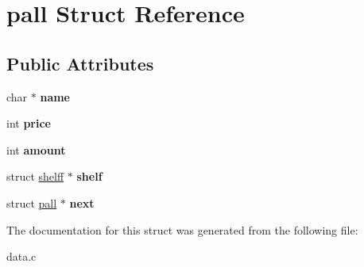 \hypertarget{structpall}{\section{pall Struct Reference}
\label{structpall}
}
\subsection*{Public Attributes}
\begin{DoxyCompactItemize}
\item 
\hypertarget{structpall_a43b9031a0f90f50921fc2235f1cfdb9c}{char $\ast$ {\bfseries name}}\label{structpall_a43b9031a0f90f50921fc2235f1cfdb9c}

\item 
\hypertarget{structpall_a0f6b561a21513e66fc9876bb1ceffbf7}{int {\bfseries price}}\label{structpall_a0f6b561a21513e66fc9876bb1ceffbf7}

\item 
\hypertarget{structpall_afd3ff32800ffbe6922b5b8abd8152f0e}{int {\bfseries amount}}\label{structpall_afd3ff32800ffbe6922b5b8abd8152f0e}

\item 
\hypertarget{structpall_a0449f6cf45c985c99beef030a6b66a1e}{struct \hyperlink{structshelff}{shelff} $\ast$ {\bfseries shelf}}\label{structpall_a0449f6cf45c985c99beef030a6b66a1e}

\item 
\hypertarget{structpall_a9580ca56ccfbd35a2948fb8769b372ad}{struct \hyperlink{structpall}{pall} $\ast$ {\bfseries next}}\label{structpall_a9580ca56ccfbd35a2948fb8769b372ad}

\end{DoxyCompactItemize}


The documentation for this struct was generated from the following file\-:\begin{DoxyCompactItemize}
\item 
data.\-c\end{DoxyCompactItemize}
